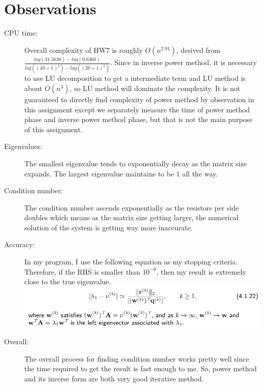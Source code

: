 \documentclass[12pt,a4paper]{article}
\begin{document}
\section{Observations}

\begin{description}

\item [CPU time:]  Overall complexity of HW7 is roughly $O(n^{2.91})$, derived from $\frac{log(31.5630) - log(0.6360)}{log((40+1)^2) - log((20+1)^2)}$. Since in inverse power method, it is necessary to use LU decomposition to get a intermediate term and LU method is about $O(n^3)$, so LU method will dominate the complexity. It is not guaranteed to directly find complexity of power method by observation in this assignment except we separately measure the time of power method phase and inverse power method phase, but that is not the main purpose of this assignment.

\item [Eigenvalues:] The smallest eigenvalue tends to exponentially decay as the matrix size expands. The largest eigenvalue maintains to be $1$ all the way. 

\item [Condition number:] The condition number ascends exponentially as the resistors per side doubles which means as the matrix size getting larger, the numerical solution of the system is getting way more inaccurate. 

\item [Accuracy:] In my program, I use the following equation as my stopping criteria. Therefore, if the RHS is smaller than $10^{-9}$, then my result is extremely close to the true eigenvalue.\\
\includegraphics[scale =0.5]{./stopping_criteria.png}\\

\item[Overall:] The overall process for finding condition number works pretty well since the time required to get the result is fast enough to me. So, power method and its inverse form are both very good iterative method.


\end{description}
\end{document}
